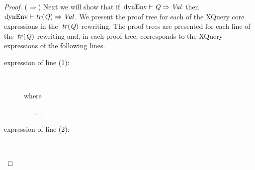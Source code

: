 \begin{proof}
  \medskip
  \noindent ($\Rightarrow$) 
  Next we will show that if~${\textrm{dynEnv}} \vdash \mathit{{Q}_{}} \Rightarrow \mathit{{Val}_{}}$ then~${\textrm{dynEnv}} \vdash \mathit{tr}\!\left(\mathit{{Q}_{}}\right) \Rightarrow \mathit{{Val}_{}}$.
  We present the proof tree for each of the XQuery core expressions in the~$\mathit{tr}\!\left(\mathit{{Q}_{}}\right)$
  rewriting.  The proof trees are presented for each line of the~$\mathit{tr}\!\left(\mathit{{Q}_{}}\right)$ rewriting and, in each
  proof tree,  corresponds to the XQuery expressions of the following lines.
  \begin{description}
  \item[\LET expression of line (1):]~
      \begin{prooftreefunction}
        
        
      \end{prooftreefunction}%
    \noindent where 
    \begin{small}
      \begin{tree}
        \ \  = \dyn {} \enspace .
        \label{tree:dynEvn1}
      \end{tree}%
    \end{small}%

    \pagebreak[3]
  \item[\FOR expression of line (2):]~
      \begin{prooftreefunction}


\end{prooftreefunction}
\end{description}
\end{proof}
